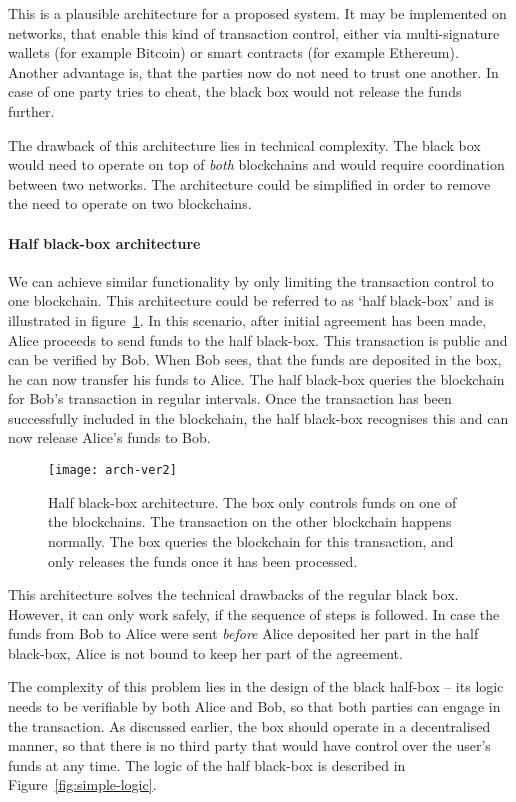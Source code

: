 This is a plausible architecture for a proposed system. It may be implemented on networks, that enable this kind of transaction control, either via multi-signature wallets (for example Bitcoin) or smart contracts (for example Ethereum). Another advantage is, that the parties now do not need to trust one another. In case of one party tries to cheat, the black box would not release the funds further.

The drawback of this architecture lies in technical complexity. The black box would need to operate on top of \textit{both} blockchains and would require coordination between two networks. The architecture could be simplified in order to remove the need to operate on two blockchains.

\paragraph{Half black-box architecture}
We can achieve similar functionality by only limiting the transaction control to one blockchain. This architecture could be referred to as `half black-box' and is illustrated in figure~\ref{fig:arch-ver2}. In this scenario, after initial agreement has been made, Alice proceeds to send funds to the half black-box. This transaction is public and can be verified by Bob. When Bob sees, that the funds are deposited in the box, he can now transfer his funds to Alice. The half black-box queries the blockchain for Bob's transaction in regular intervals. Once the transaction has been successfully included in the blockchain, the half black-box recognises this and can now release Alice's funds to Bob.
% 
\begin{figure}[ht]
    \centering
    \texttt{[image: arch-ver2]}
    \caption{Half black-box architecture. The box only controls funds on one of the blockchains. The transaction on the other blockchain happens normally. The box queries the blockchain for this transaction, and only releases the funds once it has been processed.}
    \label{fig:arch-ver2}
\end{figure}

This architecture solves the technical drawbacks of the regular black box. However, it can only work safely, if the sequence of steps is followed. In case the funds from Bob to Alice were sent \textit{before} Alice deposited her part in the half black-box, Alice is not bound to keep her part of the agreement.

The complexity of this problem lies in the design of the black half-box -- its logic needs to be verifiable by both Alice and Bob, so that both parties can engage in the transaction. As discussed earlier, the box should operate in a decentralised manner, so that there is no third party that would have control over the user's funds at any time. The logic of the half black-box is described in Figure~\ref{fig:simple-logic}.

